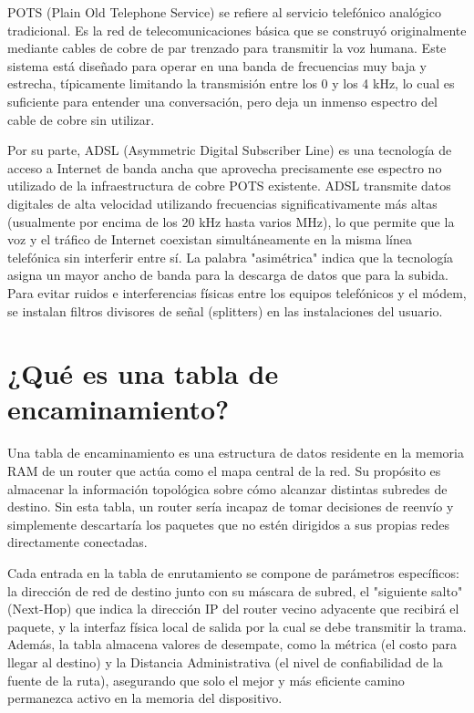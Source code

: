\documentclass[a4paper,12pt]{article}
\begin{document}
POTS (Plain Old Telephone Service) se refiere al servicio telefónico analógico tradicional. Es la red de telecomunicaciones básica que se construyó originalmente mediante cables de cobre de par trenzado para transmitir la voz humana. Este sistema está diseñado para operar en una banda de frecuencias muy baja y estrecha, típicamente limitando la transmisión entre los 0 y los 4 kHz, lo cual es suficiente para entender una conversación, pero deja un inmenso espectro del cable de cobre sin utilizar.

Por su parte, ADSL (Asymmetric Digital Subscriber Line) es una tecnología de acceso a Internet de banda ancha que aprovecha precisamente ese espectro no utilizado de la infraestructura de cobre POTS existente. ADSL transmite datos digitales de alta velocidad utilizando frecuencias significativamente más altas (usualmente por encima de los 20 kHz hasta varios MHz), lo que permite que la voz y el tráfico de Internet coexistan simultáneamente en la misma línea telefónica sin interferir entre sí. La palabra "asimétrica" indica que la tecnología asigna un mayor ancho de banda para la descarga de datos que para la subida. Para evitar ruidos e interferencias físicas entre los equipos telefónicos y el módem, se instalan filtros divisores de señal (splitters) en las instalaciones del usuario.

\section{¿Qué es una tabla de encaminamiento?}

Una tabla de encaminamiento es una estructura de datos residente en la memoria RAM de un router que actúa como el mapa central de la red. Su propósito es almacenar la información topológica sobre cómo alcanzar distintas subredes de destino. Sin esta tabla, un router sería incapaz de tomar decisiones de reenvío y simplemente descartaría los paquetes que no estén dirigidos a sus propias redes directamente conectadas.

Cada entrada en la tabla de enrutamiento se compone de parámetros específicos: la dirección de red de destino junto con su máscara de subred, el "siguiente salto" (Next-Hop) que indica la dirección IP del router vecino adyacente que recibirá el paquete, y la interfaz física local de salida por la cual se debe transmitir la trama. Además, la tabla almacena valores de desempate, como la métrica (el costo para llegar al destino) y la Distancia Administrativa (el nivel de confiabilidad de la fuente de la ruta), asegurando que solo el mejor y más eficiente camino permanezca activo en la memoria del dispositivo.
\end{document}
